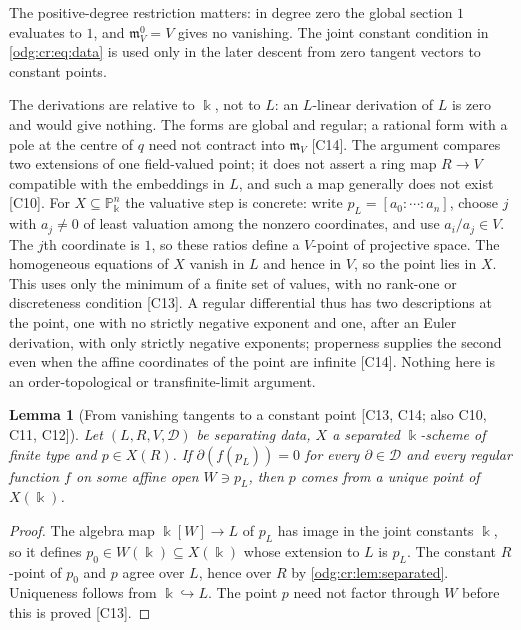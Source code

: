 \documentclass[11pt,oneside]{article}
\numberwithin{equation}{section}
\newtheorem{lemma}[lemma]{Lemma}
\theoremstyle{definition}
\theoremstyle{remark}
\newcommand{\src}[1]{\textup{\textsf{\small[#1]}}}
\begin{document}
The positive-degree restriction matters: in degree zero the global section
$1$ evaluates to $1$, and $\mathfrak m_V^0=V$ gives no vanishing. The joint
constant condition in \eqref{odg:cr:eq:data} is used only in the later
descent from zero tangent vectors to constant points.

The derivations are relative to $\Bbbk$, not to $L$: an $L$-linear derivation of
$L$ is zero and would give nothing. The forms are global and regular; a rational
form with a pole at the centre of $q$ need not contract into $\mathfrak m_V$
\src{C14}. The argument compares two extensions of one field-valued point; it
does not assert a ring map $R\to V$ compatible with the embeddings in $L$, and
such a map generally does not exist \src{C10}. For $X\subseteq\mathbb P^n_\Bbbk$
the valuative step is concrete: write $p_L=[a_0:\cdots:a_n]$, choose $j$ with $a_j\ne0$
of least valuation among the nonzero coordinates, and use $a_i/a_j\in V$.
The $j$th coordinate is $1$, so these ratios define a $V$-point of projective
space. The homogeneous equations of $X$ vanish in $L$ and hence in $V$,
so the point lies in $X$. This uses only the minimum of a finite set of
values, with no rank-one or discreteness condition \src{C13}. A regular
differential thus has two descriptions at the point, one with no strictly
negative exponent and one, after an Euler derivation, with only strictly negative
exponents; properness supplies the second even when the affine coordinates of
the point are infinite \src{C14}. Nothing here is an order-topological or
transfinite-limit argument.

\begin{lemma}[From vanishing tangents to a constant point \src{C13, C14; also C10, C11, C12}]\label{odg:cr:lem:constantpoint}
Let $(L,R,V,\mathcal D)$ be separating data, $X$ a separated $\Bbbk$-scheme of
finite type and $p\in X(R)$. If $\partial(f(p_L))=0$ for every $\partial\in\mathcal D$
and every regular function $f$ on some affine open $W\ni p_L$, then $p$ comes from
a unique point of $X(\Bbbk)$.
\end{lemma}
\begin{proof}
The algebra map $\Bbbk[W]\to L$ of $p_L$ has image in the joint constants $\Bbbk$,
so it defines $p_0\in W(\Bbbk)\subseteq X(\Bbbk)$ whose extension to $L$ is $p_L$.
The constant $R$-point of $p_0$ and $p$ agree over $L$, hence over $R$ by
\cref{odg:cr:lem:separated}. Uniqueness follows from $\Bbbk\hookrightarrow L$. The
point $p$ need not factor through $W$ before this is proved \src{C13}.
\end{proof}
\end{document}
